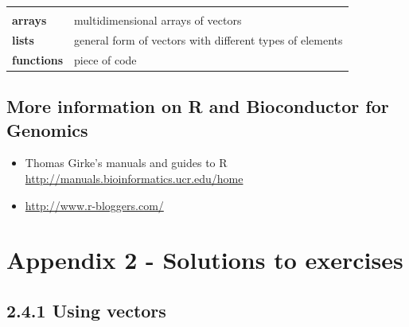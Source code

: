 \documentclass[a4paper]{book}
\providecommand{\tightlist}{%
  \setlength{\itemsep}{0pt}\setlength{\parskip}{0pt}}
\begin{document}
\begin{longtable}[]{@{}ll@{}}
\begin{minipage}[t]{0.72\columnwidth}
\end{minipage}\tabularnewline
\begin{minipage}[t]{0.09\columnwidth}\raggedright\strut
\textbf{arrays}\strut
\end{minipage} & \begin{minipage}[t]{0.72\columnwidth}\raggedright\strut
multidimensional arrays of vectors\strut
\end{minipage}\tabularnewline
\begin{minipage}[t]{0.09\columnwidth}\raggedright\strut
\textbf{lists}\strut
\end{minipage} & \begin{minipage}[t]{0.72\columnwidth}\raggedright\strut
general form of vectors with different types of elements\strut
\end{minipage}\tabularnewline
\begin{minipage}[t]{0.09\columnwidth}\raggedright\strut
\textbf{functions}\strut
\end{minipage} & \begin{minipage}[t]{0.72\columnwidth}\raggedright\strut
piece of code\strut
\end{minipage}\tabularnewline
\bottomrule
\end{longtable}

\section*{More information on R and Bioconductor for
Genomics}\label{more-information-on-r-and-bioconductor-for-genomics}

\begin{itemize}
\tightlist
\item
  Thomas Girke's manuals and guides to R
  \url{http://manuals.bioinformatics.ucr.edu/home}
\item
  \url{http://www.r-bloggers.com/}
\end{itemize}

\chapter*{Appendix 2 - Solutions to
exercises}\label{appendix-2---solutions-to-exercises}

\section*{2.4.1 Using vectors}\label{using-vectors}
\end{document}
